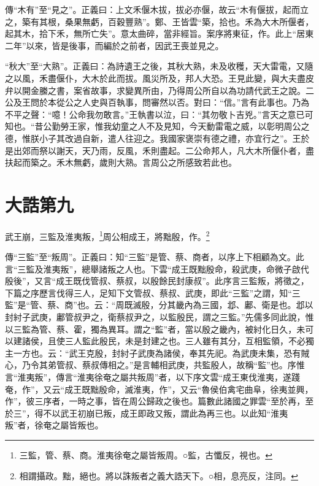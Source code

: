 {\noindent\zhuan{}\fzbyks 傳“木有”至“見之”。正義曰：上文禾偃木拔，拔必亦偃，故云“木有偃拔，起而立之，築有其根，桑果無虧，百穀豐熟”。鄭、王皆雲“築，拾也。禾為大木所偃者，起其木，拾下禾，無所亡失”。意太曲碎，當非經旨。案序將東征，作。此上“居東二年”以來，皆是後事，而編於之前者，因武王喪並見之。 \par}

{\noindent\shu{}\fzkt “秋大”至“大熟”。正義曰：為詩遺王之後，其秋大熟，未及收穫，天大雷電，又隨之以風，禾盡偃仆，大木於此而拔。風災所及，邦人大恐。王見此變，與大夫盡皮弁以開金縢之書，案省故事，求變異所由，乃得周公所自以為功請代武王之說。二公及王問於本從公之人史與百執事，問審然以否。對曰：“信。”言有此事也。乃為不平之聲：“噫！公命我勿敢言。”王執書以泣，曰：“其勿敬卜吉兇。”言天之意已可知也。“昔公勤勞王家，惟我幼童之人不及見知，今天動雷電之威，以彰明周公之德，惟朕小子其改過自新，遣人往迎之。我國家褒崇有德之禮，亦宜行之”。王於是出郊而祭以謝天，天乃雨，反風，禾則盡起。二公命邦人，凡大木所偃仆者，盡扶起而築之。禾木無虧，歲則大熟。言周公之所感致若此也。 \par}

\section{大誥第九}


武王崩，三監及淮夷叛，\footnote{三監，管、蔡、商。淮夷徐奄之屬皆叛周。○監，古懺反，視也。}周公相成王，將黜殷，作。\footnote{相謂攝政。黜，絕也。將以誅叛者之義大誥天下。○相，息亮反，注同。}

{\noindent\zhuan{}\fzbyks 傳“三監”至“叛周”。正義曰：知“三監”是管、蔡、商者，以序上下相顧為文。此言“三監及淮夷叛”，總舉諸叛之人也。下雲“成王既黜殷命，殺武庚，命微子啟代殷後”，又言“成王既伐管叔、蔡叔，以殷餘民封康叔”。此序言三監叛，將徵之，下篇之序歷言伐得三人，足知下文管叔、蔡叔、武庚，即此“三監”之謂，知“三監”是“管、蔡、商”也。云：“周既滅殷，分其畿內為三國，邶、鄘、衛是也。邶以封紂子武庚，鄘管叔尹之，衛蔡叔尹之，以監殷民，謂之三監。”先儒多同此說，惟以三監為管、蔡、霍，獨為異耳。謂之“監”者，當以殷之畿內，被紂化日久，未可以建諸侯，且使三人監此殷民，未是封建之也。三人雖有其分，互相監領，不必獨主一方也。云：“武王克殷，封紂子武庚為諸侯，奉其先祀。為武庚未集，恐有賊心，乃令其弟管叔、蔡叔傳相之。”是言輔相武庚，共監殷人，故稱“監”也。序惟言“淮夷叛”，傳言“淮夷徐奄之屬共叛周”者，以下序文雲“成王東伐淮夷，遂踐奄，作”，又云“成王既黜殷命，滅淮夷，作”，又云“魯侯伯禽宅曲阜，徐夷並興，作”，彼三序者，一時之事，皆在周公歸政之後也。篇數此諸國之罪雲“至於再，至於三”，得不以武王初崩已叛，成王即政又叛，謂此為再三也。以此知“淮夷叛”者，徐奄之屬皆叛也。 \par}


